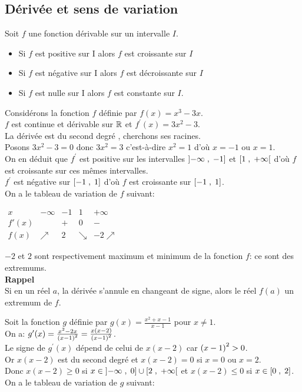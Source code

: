 \subsection*{Dérivée et sens de variation}
\begin{theorem}
Soit $ f $ une fonction dérivable sur un intervalle $ I. $
\begin{itemize}
\item Si $ f $ est positive sur I alors  $f$ est  croissante sur $I$ 
\item Si $ f $ est négative sur I alors  $f$ est  décroissante sur $I$ 
\item Si  $ f $ est nulle  sur I alors  $f$ est  constante sur $I$. 
\end{itemize}
\end{theorem}
\begin{example}
Considérons la fonction $ f $ définie par $ f(x)=x^{3}-3x$.\\
$ f $  est continue et dérivable sur $ \mathbb{R} $  et  $ f^{\prime}(x)=3x^{2}-3$.\\
La dérivée est du second degré , cherchons ses racines.\\ Posons $3x^{2}-3=0   $ donc $ 3x^{2}=3 $ c'est-à-dire $ x^{2}=1$ d'où $x=-1 $ ou $x=1 $.\\
 On en déduit que $ f^{\prime} $ est positive sur les intervalles $ \left]-\infty \;, \;-1\right] $  et $ \left[1 \;,\; +\infty\right[ $  d'où $ f $ est croissante sur ces mêmes intervalles.\\
$ f^{\prime} $  est négative sur $ \left[-1\;,\; 1\right] $ d'où $ f $ est croissante sur $ \left[-1\;,\; 1\right] $. \\On a le tableau de variation de $ f $ suivant:
\begin{center}
$\begin{array}{c|cccc}
x & -\infty & -1 & 1 & +\infty \\
\hline
f'(x) &      & + & 0 & - \\
f(x)  & \nearrow & 2 & \searrow & -2 \nearrow
\end{array}$

\end{center}
$-2$   et  $2 $ sont respectivement maximum et minimum de la fonction $ f $: ce sont des extremums.\\
\textbf{Rappel}\\ Si en un réel $ a $, la dérivée s'annule en changeant de
signe, alors le réel $ f(a) $ un extremum de $ f $.
\end{example}
\begin{example} 
Soit la fonction $ g $ définie par $ g(x)=\frac{x^{2}+x-1}{x-1} $ pour $ x\neq1 $.\\
On a:\; $ g^{\prime}(x)=\frac{x^{2}-2x}{\left(x-1\right)^{2}} =\frac{x(x-2)}{\left(x-1\right)^{2}}$.\\ Le signe de $ g^{\prime}(x) $ dépend de celui de $ x(x-2) $  car $ \left(x-1\right)^{2}>0 $.\\ Or $ x(x-2) $ est du second degré et $ x(x-2)=0 $  si $ x=0$ ou $x=2 $.\\ Donc $ x(x-2) \geq0$  si $ x\in\left]-\infty \;, \;0\right] \cup \left[2 \;,\; +\infty\right[$\; et $ x(x-2)\leq 0$  si             $ x\in\left[0\;,\; 2\right] $.\\
On a le tableau de variation de $ g $ suivant:
\end{example}
